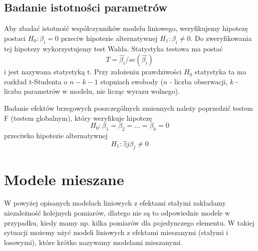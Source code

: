 \documentclass[12pt]{mwbk}
\theoremstyle{plain}
\theoremstyle{definition}
\theoremstyle{remark}
\begin{document}
\subsection{Badanie istotności parametrów}

Aby zbadać istotność współczynników modelu liniowego, weryfikujemy hipotezę postaci $H_0: \beta_i = 0$ przeciw hipotezie alternatywnej $H_1: \beta_i \neq 0.																																																																																																																																																																																																																																																																																																																																																																																																																																																																																																																													$ Do zweryfikowania tej hipotezy wykorzystujemy test Walda. Statystyka testowa ma postać $$T=\hat{\beta_i}/se(\hat{\beta_i})$$ i jest nazywana statystyką t. Przy założeniu prawdziwości $H_0$ statystyka ta ma rozkład t-Studenta o $n-k-1$ stopniach swobody ($n$ - liczba obserwacji, $k$ - liczba parametrów w modelu, nie licząc wyrazu wolnego).

Badanie efektów brzegowych poszczególnych zmiennych należy poprzedzić testem F (testem globalnym), który weryfikuje hipotezę $$H_0: \beta_1=\beta_2=\ldots=\beta_k=0$$
 przeciwko hipotezie alternatywnej $$H_1: \exists{j} \beta_j \neq 0 $$


\section{Modele mieszane} 
W powyżej opisanych modelach liniowych z efektami stałymi zakładamy niezależność kolejnych pomiarów, dlatego nie są to odpowiednie modele w przypadku, kiedy mamy np. kilka pomiarów dla pojedynczego elementu. W takiej sytuacji możemy użyć modeli liniowych z efektami mieszanymi (stałymi i losowymi), które krótko nazywamy modelami mieszanymi.
\end{document}
